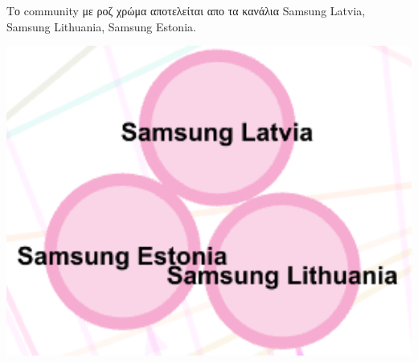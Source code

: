 \documentclass[12pt]{article}
\begin{document}
	\vspace{12pt}
	\vspace{12pt}
	\vspace{12pt}
	\begin{minipage}{0.6\textwidth}
		Το community με ροζ χρώμα αποτελείται απο τα κανάλια Samsung Latvia, Samsung Lithuania, Samsung Estonia.
	\end{minipage}
	\hspace{0.05\textwidth}
	\begin{minipage}{0.3\textwidth}
		\includegraphics[width=1.0\textwidth]{photos-files/section12/0.1/lith_est_latv_community.png}
	\end{minipage}
	
\end{document}
